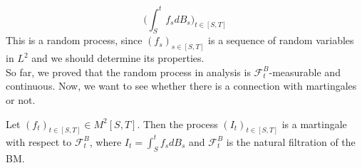 \begin{equation*}
    \big(\int_S^t f_s dB_s\big)_{t\in [S,T]}
\end{equation*}
This is a random process, since $(f_s)_{s \in [S,T]}$ is a sequence of random variables in $L^2$ and we should determine its properties.\\

So far, we proved that the random process in analysis is $\mathcal{F}_t^B$-measurable and continuous. Now, we want to see whether there is a connection with martingales or not. 

\begin{ThBox}
    \begin{Th}
    Let $(f_t)_{t \in [S,T]} \in M^2[S,T]$. Then the process $(I_t)_{t \in [S,T]}$ is a martingale with respect to $\mathcal{F}_t^B$, where $I_t = \int_S^t f_s dB_s$ and $\mathcal{F}_t^B$ is the natural filtration of the BM.
\end{Th}
\end{ThBox}
